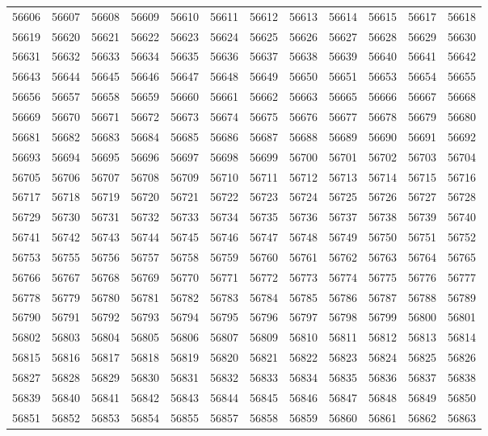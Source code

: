 \begin{center}
\begin{longtable}{llllllllllll}
56606 &56607 &56608 &56609 &56610 &56611 &56612 &56613 &56614 &56615 &56617 &56618 \\
56619 &56620 &56621 &56622 &56623 &56624 &56625 &56626 &56627 &56628 &56629 &56630 \\
56631 &56632 &56633 &56634 &56635 &56636 &56637 &56638 &56639 &56640 &56641 &56642 \\
56643 &56644 &56645 &56646 &56647 &56648 &56649 &56650 &56651 &56653 &56654 &56655 \\
56656 &56657 &56658 &56659 &56660 &56661 &56662 &56663 &56665 &56666 &56667 &56668 \\
56669 &56670 &56671 &56672 &56673 &56674 &56675 &56676 &56677 &56678 &56679 &56680 \\
56681 &56682 &56683 &56684 &56685 &56686 &56687 &56688 &56689 &56690 &56691 &56692 \\
56693 &56694 &56695 &56696 &56697 &56698 &56699 &56700 &56701 &56702 &56703 &56704 \\
56705 &56706 &56707 &56708 &56709 &56710 &56711 &56712 &56713 &56714 &56715 &56716 \\
56717 &56718 &56719 &56720 &56721 &56722 &56723 &56724 &56725 &56726 &56727 &56728 \\
56729 &56730 &56731 &56732 &56733 &56734 &56735 &56736 &56737 &56738 &56739 &56740 \\
56741 &56742 &56743 &56744 &56745 &56746 &56747 &56748 &56749 &56750 &56751 &56752 \\
56753 &56755 &56756 &56757 &56758 &56759 &56760 &56761 &56762 &56763 &56764 &56765 \\
56766 &56767 &56768 &56769 &56770 &56771 &56772 &56773 &56774 &56775 &56776 &56777 \\
56778 &56779 &56780 &56781 &56782 &56783 &56784 &56785 &56786 &56787 &56788 &56789 \\
56790 &56791 &56792 &56793 &56794 &56795 &56796 &56797 &56798 &56799 &56800 &56801 \\
56802 &56803 &56804 &56805 &56806 &56807 &56809 &56810 &56811 &56812 &56813 &56814 \\
56815 &56816 &56817 &56818 &56819 &56820 &56821 &56822 &56823 &56824 &56825 &56826 \\
56827 &56828 &56829 &56830 &56831 &56832 &56833 &56834 &56835 &56836 &56837 &56838 \\
56839 &56840 &56841 &56842 &56843 &56844 &56845 &56846 &56847 &56848 &56849 &56850 \\
56851 &56852 &56853 &56854 &56855 &56857 &56858 &56859 &56860 &56861 &56862 &56863 \\

\end{longtable}
\end{center}
